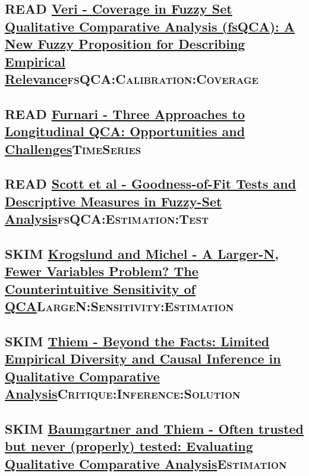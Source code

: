 \documentclass[11pt]{article}
\begin{document}
\subsection*{{\bfseries\sffamily READ} \href{https://doi.org/10.1163/15691330-12341457}{Veri - Coverage in Fuzzy Set Qualitative Comparative Analysis (fsQCA): A New Fuzzy Proposition for Describing Empirical Relevance}\hfill{}\textsc{fsQCA:Calibration:Coverage}}
\label{sec:orgfcaf3ce}

\subsection*{{\bfseries\sffamily READ} \href{http://faculty.marshall.usc.edu/Peer-Fiss/5\_Furnari\_2019\_Longitudinal\_QCA\_AOM\_PDW2019.pdf}{Furnari - Three Approaches to Longitudinal QCA: Opportunities and Challenges}\hfill{}\textsc{TimeSeries}}
\label{sec:orgf60b0c5}
\subsection*{{\bfseries\sffamily READ} \href{http://dx.doi.org/10.1177/0049124109339371}{Scott et al - Goodness-of-Fit Tests and Descriptive Measures in Fuzzy-Set Analysis}\hfill{}\textsc{fsQCA:Estimation:Test}}
\label{sec:orgba5d4fe}

\subsection*{{\bfseries\sffamily SKIM} \href{https://ssrn.com/abstract=2552940}{ Krogslund and Michel -  A Larger-N, Fewer Variables Problem? The Counterintuitive Sensitivity of QCA}\hfill{}\textsc{LargeN:Sensitivity:Estimation}}
\label{sec:orge99d8b8}
\subsection*{{\bfseries\sffamily SKIM} \href{https://doi.org/10.1177\%2F0049124119882463}{Thiem - Beyond the Facts: Limited Empirical Diversity and Causal Inference in Qualitative Comparative Analysis}\hfill{}\textsc{Critique:Inference:Solution}}
\label{sec:org61e5492}

\subsection*{{\bfseries\sffamily SKIM} \href{https://doi.org/10.1177/0049124117701487}{Baumgartner and Thiem - Often trusted but never (properly) tested: Evaluating Qualitative Comparative Analysis}\hfill{}\textsc{Estimation}}
\label{sec:orgc754783}
\end{document}
